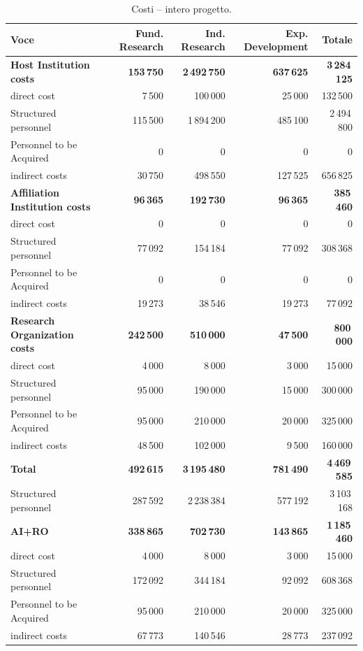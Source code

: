 \documentclass{plan4ari_report}
\begin{document}
\begin{table}[H]\centering\small
\caption{Costi -- intero progetto.}\label{tab:bpy-c-tot}
\begin{tabular}{lrrrr}\toprule
\textbf{Voce} & \textbf{Fund. Research} & \textbf{Ind. Research} & \textbf{Exp. Development} & \textbf{Totale} \\\midrule
\textbf{Host Institution costs} & \textbf{153\,750} & \textbf{2\,492\,750} & \textbf{637\,625} & \textbf{3\,284\,125} \\
\quad direct cost & 7\,500 & 100\,000 & 25\,000 & 132\,500 \\
\quad Structured personnel & 115\,500 & 1\,894\,200 & 485\,100 & 2\,494\,800 \\
\quad Personnel to be Acquired & 0 & 0 & 0 & 0 \\
\quad indirect costs & 30\,750 & 498\,550 & 127\,525 & 656\,825 \\
\textbf{Affiliation Institution costs} & \textbf{96\,365} & \textbf{192\,730} & \textbf{96\,365} & \textbf{385\,460} \\
\quad direct cost & 0 & 0 & 0 & 0 \\
\quad Structured personnel & 77\,092 & 154\,184 & 77\,092 & 308\,368 \\
\quad Personnel to be Acquired & 0 & 0 & 0 & 0 \\
\quad indirect costs & 19\,273 & 38\,546 & 19\,273 & 77\,092 \\
\textbf{Research Organization costs} & \textbf{242\,500} & \textbf{510\,000} & \textbf{47\,500} & \textbf{800\,000} \\
\quad direct cost & 4\,000 & 8\,000 & 3\,000 & 15\,000 \\
\quad Structured personnel & 95\,000 & 190\,000 & 15\,000 & 300\,000 \\
\quad Personnel to be Acquired & 95\,000 & 210\,000 & 20\,000 & 325\,000 \\
\quad indirect costs & 48\,500 & 102\,000 & 9\,500 & 160\,000 \\
\midrule
\textbf{Total} & \textbf{492\,615} & \textbf{3\,195\,480} & \textbf{781\,490} & \textbf{4\,469\,585} \\
\quad Structured personnel & 287\,592 & 2\,238\,384 & 577\,192 & 3\,103\,168 \\
\textbf{AI+RO} & \textbf{338\,865} & \textbf{702\,730} & \textbf{143\,865} & \textbf{1\,185\,460} \\
\quad direct cost & 4\,000 & 8\,000 & 3\,000 & 15\,000 \\
\quad Structured personnel & 172\,092 & 344\,184 & 92\,092 & 608\,368 \\
\quad Personnel to be Acquired & 95\,000 & 210\,000 & 20\,000 & 325\,000 \\
\quad indirect costs & 67\,773 & 140\,546 & 28\,773 & 237\,092 \\
\bottomrule\end{tabular}
\end{table}
\end{document}
